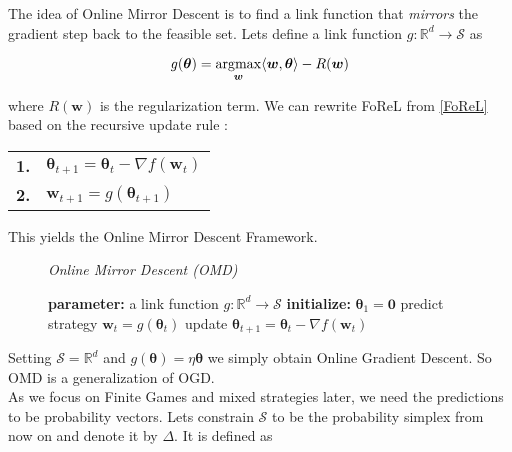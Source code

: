 The idea of Online Mirror Descent is to find a link function that \textit{mirrors} the gradient step back to the feasible set. Lets define a link function $g: \mathbb{R}^d \to \mathcal{S}$ as 

\begin{equation}\label{link}
    g(\boldsymbol{\theta}) = \operatorname*{\arg\!\max}_{\boldsymbol{w}} \langle\boldsymbol{w},\boldsymbol{\theta}\rangle - R(\boldsymbol{w})
\end{equation}

where $R(\boldsymbol{w})$ is the regularization term. We can rewrite FoReL from \ref{FoReL} based on the recursive update rule \cite{shalev}: 

\begin{center}
    \begin{tabular}{ll}
    \textbf{1.} & $\boldsymbol{\theta}_{t+1} = \boldsymbol{\theta}_t - \nabla f(\boldsymbol{w}_t)$\\
    \textbf{2.} & $\boldsymbol{w}_{t+1} = g(\boldsymbol{\theta}_{t+1})$\\
    \end{tabular} 
\end{center}

This yields the Online Mirror Descent Framework. 

\begin{figure}[H]\centering
    \textit{Online Mirror Descent (OMD)}
    \begin{minipage}{.7\linewidth}
        \begin{algorithm}[H]
        \DontPrintSemicolon
        \textbf{parameter: } a link function $g: \mathbb{R}^d \to \mathcal{S}$ \;
        \textbf{initialize: } $\boldsymbol{\theta}_1 = \boldsymbol{0}$ \;
         {
        predict strategy $\boldsymbol{w}_t = g(\boldsymbol{\theta}_t)$ \;
        update $\boldsymbol{\theta}_{t+1} = \boldsymbol{\theta}_t - \nabla f(\boldsymbol{w}_t)$ \;
        }
        \end{algorithm}\caption*{}
  \end{minipage}
\end{figure}
Setting $\mathcal{S}= \mathbb{R}^d$ and $g(\boldsymbol{\theta}) = \eta\boldsymbol{\theta}$ we simply obtain Online Gradient Descent. So OMD is a generalization of OGD. \\

As we focus on Finite Games and mixed strategies later, we need the predictions to be probability vectors. Lets constrain $\mathcal{S}$ to be the probability simplex from now on and denote it by $\Delta$. It is defined as 

